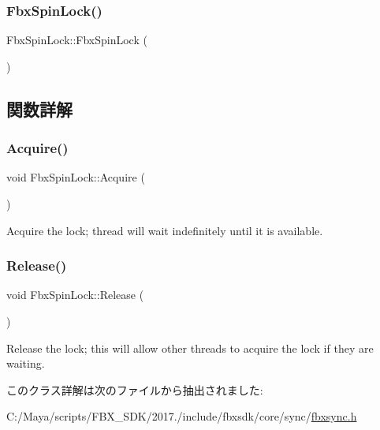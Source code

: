 \subsubsection{\texorpdfstring{Fbx\+Spin\+Lock()}{FbxSpinLock()}}
{\footnotesize\ttfamily Fbx\+Spin\+Lock\+::\+Fbx\+Spin\+Lock (\begin{DoxyParamCaption}{ }\end{DoxyParamCaption})}



\subsection{関数詳解}
\mbox{\label{class_fbx_spin_lock_a6f5aa93e51e6bd4717337bfb2216c371}} 
\subsubsection{\texorpdfstring{Acquire()}{Acquire()}}
{\footnotesize\ttfamily void Fbx\+Spin\+Lock\+::\+Acquire (\begin{DoxyParamCaption}{ }\end{DoxyParamCaption})}

Acquire the lock; thread will wait indefinitely until it is available. \mbox{\label{class_fbx_spin_lock_a3cc819cf0168dfc482696650b32c07f6}} 
\subsubsection{\texorpdfstring{Release()}{Release()}}
{\footnotesize\ttfamily void Fbx\+Spin\+Lock\+::\+Release (\begin{DoxyParamCaption}{ }\end{DoxyParamCaption})}

Release the lock; this will allow other threads to acquire the lock if they are waiting. 

このクラス詳解は次のファイルから抽出されました\+:\begin{DoxyCompactItemize}
\item 
C\+:/\+Maya/scripts/\+F\+B\+X\+\_\+\+S\+D\+K/2017./include/fbxsdk/core/sync/\hyperlink{fbxsync_8h}{fbxsync.\+h}\end{DoxyCompactItemize}
